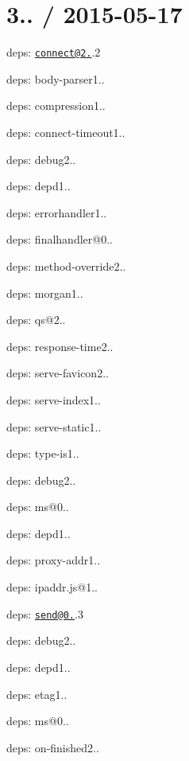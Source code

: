 {\ttfamily \section*{3.. / 2015-\/05-\/17 }}

{\ttfamily }

{\ttfamily 
\begin{DoxyItemize}
\item deps\+: \href{mailto:connect@2.29}{\tt connect@2.}.2
\begin{DoxyItemize}
\item deps\+: body-\/parser1..
\item deps\+: compression1..
\item deps\+: connect-\/timeout1..
\item deps\+: debug2..
\item deps\+: depd1..
\item deps\+: errorhandler1..
\item deps\+: finalhandler@0..
\item deps\+: method-\/override2..
\item deps\+: morgan1..
\item deps\+: qs@2..
\item deps\+: response-\/time2..
\item deps\+: serve-\/favicon2..
\item deps\+: serve-\/index1..
\item deps\+: serve-\/static1..
\item deps\+: type-\/is1..
\end{DoxyItemize}
\item deps\+: debug2..
\begin{DoxyItemize}
\item deps\+: ms@0..
\end{DoxyItemize}
\item deps\+: depd1..
\item deps\+: proxy-\/addr1..
\begin{DoxyItemize}
\item deps\+: ipaddr.\+js@1..
\end{DoxyItemize}
\item deps\+: \href{mailto:send@0.12}{\tt send@0.}.3
\begin{DoxyItemize}
\item deps\+: debug2..
\item deps\+: depd1..
\item deps\+: etag1..
\item deps\+: ms@0..
\item deps\+: on-\/finished2..
\end{DoxyItemize}
\end{DoxyItemize}}

